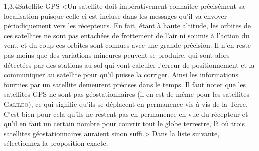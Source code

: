 \begin{quiz}[title={Localisation, cartographie et mobilité}]
\begin{quizquestion*}[t]{2}{1,3,4}{Satellite GPS}
<Un satellite doit impérativement connaître précisément sa localisation puisque celle-ci est incluse dans les messages qu’il va envoyer périodiquement vers les récepteurs.
En fait, étant à haute altitude, les orbites de ces satellites ne sont pas entachées de frottement de l’air ni soumis à l’action du vent, et du coup ces orbites sont connues avec une grande précision.
Il n’en reste pas moins que des variations mineures peuvent se produire, qui sont alors détectées par des stations au sol qui vont calculer l’erreur de positionnement et la communiquer au satellite pour qu’il puisse la corriger. Ainsi les informations fournies par un satellite demeurent précises dans le temps.
Il faut noter que les satellites GPS ne sont pas géostationnaires (il en est de même pour les satellites \textsc{Galileo}), ce qui signifie qu’ils se déplacent en permanence vis-à-vis de la Terre. C’est bien pour cela qu’ils ne restent pas en permanence en vue du récepteur et qu’il en faut un certain nombre pour couvrir tout le globe terrestre, là où trois satellites géostationnaires auraient sinon suffi.>
Dans la liste suivante, sélectionnez la proposition exacte.
\end{quizquestion*}


\end{quiz}
